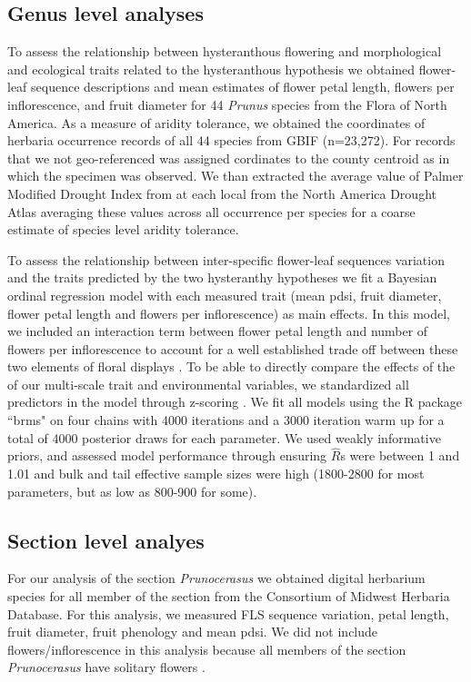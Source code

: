 \documentclass{article}\usepackage[]{graphicx}\usepackage[]{color}
\begin{document}
\subsection{Genus level analyses}
To assess the relationship between hysteranthous flowering and morphological and ecological traits related to the hysteranthous hypothesis we obtained flower-leaf sequence descriptions and mean estimates of flower petal length, flowers per inflorescence, and fruit diameter for 44 \textit{Prunus} species from the Flora of North America. As a measure of aridity tolerance, we obtained the coordinates of herbaria occurrence records of all 44 species from GBIF (n=23,272). For records that we not geo-referenced was assigned cordinates to the county centroid as in which the specimen was observed. We than extracted the average value of Palmer Modified Drought Index from at each local from the North America Drought Atlas \citep{} averaging these values across all occurrence per species for a coarse estimate of species level aridity tolerance. 

\noindent To assess the relationship between inter-specific flower-leaf sequences variation and the traits predicted by the two hysteranthy hypotheses we fit a Bayesian ordinal regression model with each measured trait (mean pdsi, fruit diameter, flower petal length and flowers per inflorescence) as main effects. In this model, we included an interaction term between flower petal length and number of flowers per inflorescence to account for a well established trade off between these two elements of floral displays \citep{}.
To be able to directly compare the effects of the of our multi-scale trait and environmental variables, we standardized all predictors in the model through z-scoring \citep{}. We fit all models using the R package ``brms" \citep{Burkner2018} on four chains with 4000 iterations and a 3000 iteration warm up for a total of 4000 posterior draws for each parameter. We used weakly informative priors, and assessed model performance through ensuring $\hat{R}$s were between 1 and 1.01 and bulk and tail effective sample sizes were high (1800-2800 for most parameters, but as low as  800-900 for some).


\subsection{Section level analyes}
For our analysis of the section \textit{Prunocerasus} we obtained digital herbarium species for all member of the section from the Consortium of Midwest Herbaria Database. For this analysis, we measured FLS sequence variation, petal length, fruit diameter, fruit phenology and mean pdsi. We did not include flowers/inflorescence  in this analysis because all members of the section \textit{Prunocerasus} have solitary flowers \citep{}.
\end{document}

